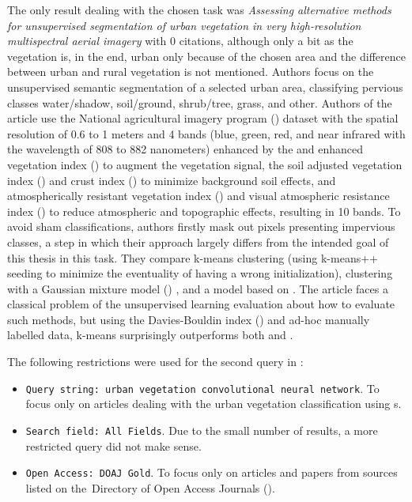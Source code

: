 The only result dealing with the chosen task was \textit{Assessing alternative methods for unsupervised segmentation of urban vegetation in very high-resolution multispectral aerial imagery} \cite{urban-green-unsupervised-aerial} with 0 citations, although only a bit as the vegetation is, in the end, urban only because of the chosen area and the difference between urban and rural vegetation is not mentioned. Authors focus on the unsupervised semantic segmentation of a selected urban area, classifying pervious classes water/shadow, soil/ground, shrub/tree, grass, and other. Authors of the article use the National agricultural imagery program () dataset with the spatial resolution of 0.6 to 1 meters and 4 bands (blue, green, red, and near infrared with the wavelength of 808 to 882 nanometers) enhanced by the  and enhanced vegetation index () to augment the vegetation signal, the soil adjusted vegetation index () and crust index () to minimize background soil effects, and atmospherically resistant vegetation index () and visual atmospheric resistance index () to reduce atmospheric and topographic effects, resulting in 10 bands. To avoid sham classifications, authors firstly mask out pixels presenting impervious classes, a step in which their approach largely differs from the intended goal of this thesis in this task. They compare k-means clustering \cite{k-means} (using k-means++ seeding \cite{k-means-plusplus} to minimize the eventuality of having a wrong initialization), clustering with a Gaussian mixture model () \cite{gmm}, and a  model based on \cite{cnn-hs-unsupervised-fuzzy}. The article faces a classical problem of the unsupervised learning evaluation about how to evaluate such methods, but using the Davies-Bouldin index () \cite{dbi} and ad-hoc manually labelled data, k-means surprisingly outperforms both  and .


The following restrictions were used for the second query in :

\begin{itemize}
	\item \verb|Query string: urban vegetation convolutional neural network|. To focus only on articles dealing with the urban vegetation classification using s.
	\item \verb|Search field: All Fields|. Due to the small number of results, a more restricted query did not make sense.
	\item \verb|Open Access: DOAJ Gold|. To focus only on articles and papers from sources listed on the~Di\-rectory of Open Access Journals ().
\end{itemize}

